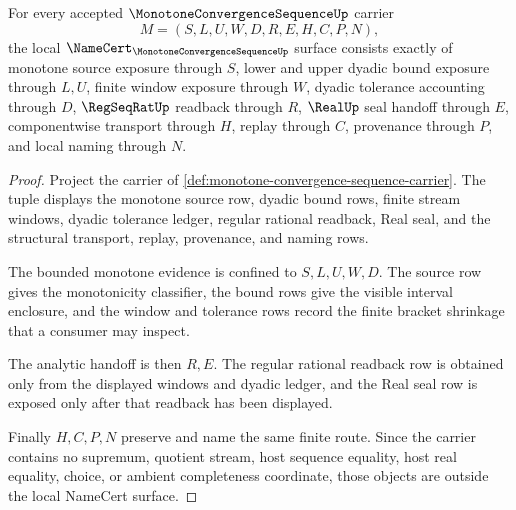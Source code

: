 \begin{theorem}
\label{thm:monotone-convergence-sequence-namecert-obligations}
For every accepted $\MonotoneConvergenceSequenceUp$ carrier
$$
M=(S,L,U,W,D,R,E,H,C,P,N),
$$
the local $\NameCert_{\MonotoneConvergenceSequenceUp}$ surface consists exactly of monotone source exposure through $S$, lower and upper dyadic bound exposure through $L,U$, finite window exposure through $W$, dyadic tolerance accounting through $D$, $\RegSeqRatUp$ readback through $R$, $\RealUp$ seal handoff through $E$, componentwise transport through $H$, replay through $C$, provenance through $P$, and local naming through $N$.
\end{theorem}
\begin{proof}
Project the carrier of \autoref{def:monotone-convergence-sequence-carrier}. The tuple displays the monotone source row, dyadic bound rows, finite stream windows, dyadic tolerance ledger, regular rational readback, Real seal, and the structural transport, replay, provenance, and naming rows.

The bounded monotone evidence is confined to $S,L,U,W,D$. The source row gives the monotonicity classifier, the bound rows give the visible interval enclosure, and the window and tolerance rows record the finite bracket shrinkage that a consumer may inspect.

The analytic handoff is then $R,E$. The regular rational readback row is obtained only from the displayed windows and dyadic ledger, and the Real seal row is exposed only after that readback has been displayed.

Finally $H,C,P,N$ preserve and name the same finite route. Since the carrier contains no supremum, quotient stream, host sequence equality, host real equality, choice, or ambient completeness coordinate, those objects are outside the local NameCert surface.
\end{proof}


